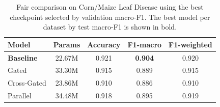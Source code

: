\begin{table}[t]
\centering
\caption{Fair comparison on Corn/Maize Leaf Disease using the best checkpoint selected by validation macro-F1. The best model per dataset by test macro-F1 is shown in bold.}
\label{tab:dino_fair_corn_maize_leaf_disease}
\begin{tabular}{lcccc}
\toprule
\textbf{Model} & \textbf{Params} & \textbf{Accuracy} & \textbf{F1-macro} & \textbf{F1-weighted}\\
\midrule
\textbf{Baseline} & 22.67M & 0.921 & \textbf{0.904} & 0.920\\
Gated & 33.30M & 0.915 & 0.889 & 0.915\\
Cross-Gated & 23.86M & 0.910 & 0.886 & 0.910\\
Parallel & 34.48M & 0.918 & 0.895 & 0.919\\
\bottomrule
\end{tabular}
\end{table}